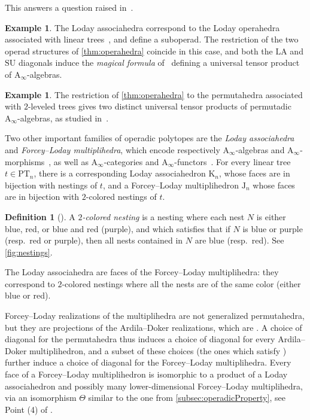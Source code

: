 \documentclass{amsart}
\newcommand{\darkblue}{\color{darkblue}} %
\theoremstyle{definition}
\newtheorem{definition}[theorem]{Definition}
\newtheorem{example}[theorem]{Example}
\newcommand{\PT}{\mathrm{PT}} %
\newcommand{\K}{\mathrm{K}} %
\newcommand{\J}{\mathrm{J}} %
\newcommand{\resp}{resp.~} %
\newcommand{\defn}[1]{\textsl{\darkblue #1}} %
\newcommand{\SU}{\mathrm{SU}}
\newcommand{\LA}{\mathrm{LA}}
\newcommand{\Ainf}{\ensuremath{\mathrm{A}_\infty}}
\begin{document}
This answers a question raised in~\cite[Rem.~3.14]{LaplanteAnfossi}.

\begin{example}
The Loday associahedra correspond to the Loday operahedra associated with linear trees~\cite[Sect. 2.2]{LaplanteAnfossi}, and define a suboperad.
The restriction of the two operad structures of \cref{thm:operahedra} coincide in this case, and both the $\LA$ and $\SU$ diagonals induce the \emph{magical formula} of~\cite{MarklShnider, MasudaThomasTonksVallette, SaneblidzeUmble-comparingDiagonals} defining a universal tensor product of $\Ainf$-algebras. 
\end{example}

\begin{example}
The restriction of \cref{thm:operahedra} to the permutahedra associated with $2$-leveled trees gives two distinct universal tensor products of permutadic $\Ainf$-algebras, as studied in~\cite{LodayRonco-permutads,Markl}.
\end{example}

Two other important families of operadic polytopes are the \emph{Loday associahedra} and \emph{Forcey--Loday multiplihedra}, which encode respectively $\Ainf$-algebras and $\Ainf$-morphisms~\cite[Prop.~4.9]{LaplanteAnfossiMazuir}, as well as $\Ainf$-categories and $\Ainf$-functors~\cite[Sect.~4.3]{LaplanteAnfossiMazuir}.
For every linear tree $t \in \PT_n$, there is a corresponding Loday associahedron $\K_n$, whose faces are in bijection with nestings of $t$, and a Forcey--Loday multiplihedron $\J_n$ whose faces are in bijection with $2$-colored nestings of $t$.

\begin{definition}[{\cite[Def. 3.2]{LaplanteAnfossiMazuir}}]\label{def:2-Colored Nesting}
	A \defn{$2$-colored nesting} is a nesting where each nest $N$ is either blue, red, or blue and red (purple), and which satisfies that if $N$ is blue or purple (\resp red or purple), then all nests contained in $N$ are blue (\resp red). 
 	See \cref{fig:nestings}.
\end{definition}

The Loday associahedra are faces of the Forcey--Loday multiplihedra: they correspond to $2$-colored nestings where all the nests are of the same color (either blue or red). 

Forcey--Loday realizations of the multiplihedra are not generalized permutahedra, but they are projections of the Ardila--Doker realizations, which are \cite[Prop. 1.16]{LaplanteAnfossiMazuir}.
A choice of diagonal for the permutahedra thus induces a choice of diagonal for every Ardila--Doker multiplihedron, and a subset of these choices (the ones which satisfy \cite[Prop. 2.7 \& 2.8]{LaplanteAnfossiMazuir}) further induce a choice of diagonal for the Forcey--Loday multiplihedra.
Every face of a Forcey--Loday multiplihedron is isomorphic to a product of a Loday associahedron and possibly many lower-dimensional Forcey--Loday multiplihedra, via an isomorphism $\Theta$ similar to the one from \cref{subsec:operadicProperty}, see Point (4) of \cite[Prop. 1.10]{LaplanteAnfossiMazuir}.
\end{document}
